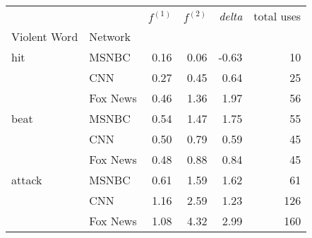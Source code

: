 \begin{tabular}{llrrrr}
\toprule
       &     & $f^{(1)}$ & $f^{(2)}$ & \emph{delta} & total uses \\
Violent Word & Network &           &           &            &            \\
\midrule
hit & MSNBC &      0.16 &      0.06 &      -0.63 &         10 \\
       & CNN &      0.27 &      0.45 &       0.64 &         25 \\
       & Fox News &      0.46 &      1.36 &       1.97 &         56 \\
\hline
beat & MSNBC &      0.54 &      1.47 &       1.75 &         55 \\
       & CNN &      0.50 &      0.79 &       0.59 &         45 \\
       & Fox News &      0.48 &      0.88 &       0.84 &         45 \\
\hline
attack & MSNBC &      0.61 &      1.59 &       1.62 &         61 \\
       & CNN &      1.16 &      2.59 &       1.23 &        126 \\
       & Fox News &      1.08 &      4.32 &       2.99 &        160 \\
\bottomrule
\end{tabular}
